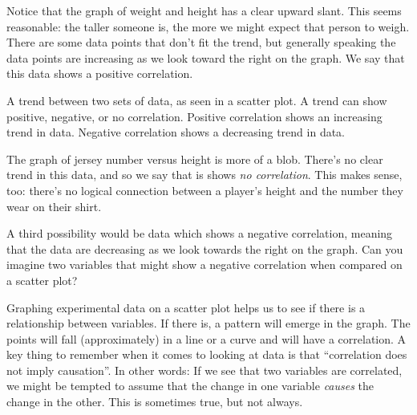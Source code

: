 Notice that the graph of weight and height has a clear upward slant. This seems reasonable: the taller someone is, the more we might expect that person to weigh. There are some data points that don't fit the trend, but generally speaking the data points are increasing as we look toward the right on the graph. We say that this data shows a positive \gls{correlation}.

\begin{boxdef}[Correlation]
A trend between two sets of data, as seen in a scatter plot. A trend can show positive, negative, or no correlation. Positive correlation shows an \gls{increasing} trend in data. Negative correlation shows a \gls{decreasing} trend in data.
\end{boxdef}

The graph of jersey number versus height is more of a blob. There's no clear trend in this data, and so we say that is shows \textit{no correlation}. This makes sense, too: there's no logical connection between a player's height and the number they wear on their shirt.

A third possibility would be data which shows a negative correlation, meaning that the data are decreasing as we look towards the right on the graph. Can you imagine two variables that might show a negative correlation when compared on a scatter plot?

Graphing experimental data on a scatter plot helps us to see if there is a relationship between variables. If there is, a pattern will emerge in the graph. The points will fall (approximately) in a line or a curve and will have a correlation. A key thing to remember when it comes to looking at data is that ``correlation does not imply causation''. In other words: If we see that two variables are correlated, we might be tempted to assume that the change in one variable \textit{causes} the change in the other. This is sometimes true, but not always.


